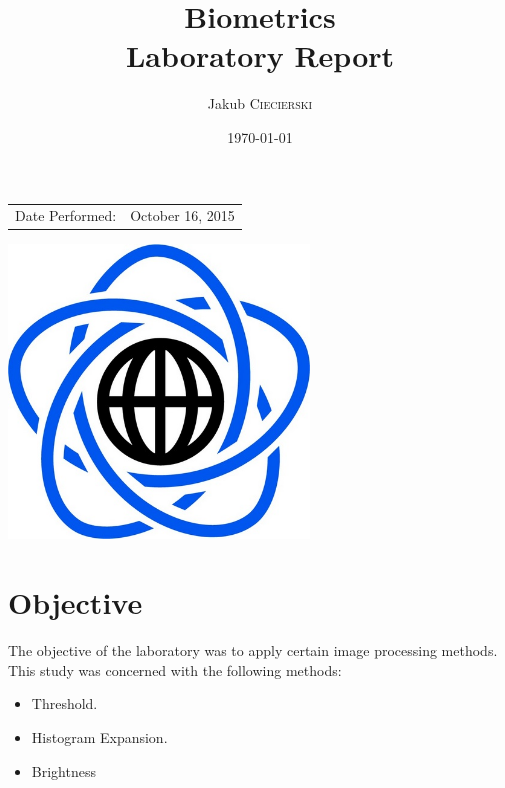 \documentclass{article}
\title{Biometrics \\ Laboratory Report} %
\author{Jakub \textsc{Ciecierski}} %
\date{\today} %
\begin{document}
\maketitle %

\begin{center}
\begin{tabular}{l r}
Date Performed: & October 16, 2015 \\ %
\end{tabular}

\vspace{60pt}
\includegraphics[width=80mm]{res/mini.PNG} \\
\end{center}


\newpage

	\tableofcontents
	
\newpage



\section{Objective}
The objective of the laboratory was to apply certain image processing methods.
This study was concerned with the following methods:
\begin{itemize}
	\item Threshold.
	\item Histogram Expansion.
	\item Brightness
\end{itemize}
\end{document}
